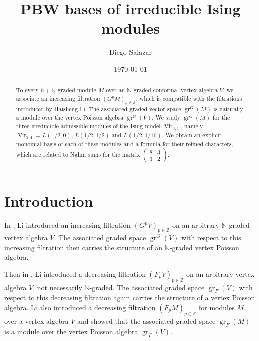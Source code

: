\documentclass[a4paper, 12pt, reqno]{amsart}
\theoremstyle{remark}
\numberwithin{equation}{subsection}
\DeclareMathOperator{\Vir}{Vir}
\DeclareMathOperator{\gr}{gr}
\begin{document}
\begin{abstract}
  To every $h + \mathbb{N}$-graded module $M$ over an $\mathbb{N}$-graded conformal vertex algebra $V$, we associate an increasing filtration $(G^pM)_{p \in \mathbb{Z}}$, which is compatible with the filtrations introduced by Haisheng Li.
  The associated graded vector space $\gr^G(M)$ is naturally a module over the vertex Poisson algebra $\gr^G(V)$.
  We study $\gr^G(M)$ for the three irreducible admissible modules of the Ising model $\Vir_{3, 4}$, namely $\Vir_{3,4} = L(1/2, 0)$, $L(1/2, 1/2)$ and $L(1/2, 1/16)$.
  We obtain an explicit monomial basis of each of these modules and a formula for their refined characters, which are related to Nahm sums for the matrix $\left(\begin{smallmatrix} 8 & 3 \\ 3 & 2 \end{smallmatrix}\right)$.
\end{abstract}

\title{PBW bases of irreducible Ising modules}
\author{Diego Salazar}
\address{Instituto de Matemática Pura e Aplicada, Rio de Janeiro, RJ, Brazil}
\date{\today}
\maketitle

\tableofcontents

\section{Introduction}
\label{sec:introduction}

In \cite{li_vertex_2004}, Li introduced an increasing filtration $(G^pV)_{p \in \mathbb{Z}}$ on an arbitrary $\mathbb{N}$-graded vertex algebra $V$.
The associated graded space $\gr^G(V)$ with respect to this increasing filtration then carries the structure of an $\mathbb{N}$-graded vertex Poisson algebra.

Then in \cite{li_abelianizing_2005}, Li introduced a decreasing filtration $(F_pV)_{p \in \mathbb{Z}}$ on an arbitrary vertex algebra $V$, not necessarily $\mathbb{N}$-graded.
The associated graded space $\gr_F(V)$ with respect to this decreasing filtration again carries the structure of a vertex Poisson algebra.
Li also introduced a decreasing filtration $(F_pM)_{p \in \mathbb{Z}}$ for modules $M$ over a vertex algebra $V$ and showed that the associated graded space $\gr_F(M)$ is a module over the vertex Poisson algebra $\gr_F(V)$.
\end{document}
